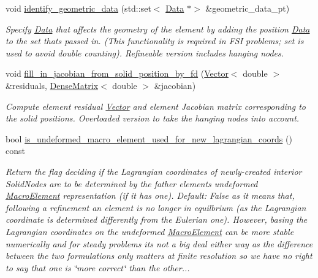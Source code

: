 \begin{DoxyCompactItemize}
void \hyperlink{classoomph_1_1RefineableSolidElement_a48623914f87556be55fb97cf68f0ee93}{identify\+\_\+geometric\+\_\+data} (std\+::set$<$ \hyperlink{classoomph_1_1Data}{Data} $\ast$$>$ \&geometric\+\_\+data\+\_\+pt)
\begin{DoxyCompactList}\small\item\em Specify \hyperlink{classoomph_1_1Data}{Data} that affects the geometry of the element by adding the position \hyperlink{classoomph_1_1Data}{Data} to the set that\textquotesingle{}s passed in. (This functionality is required in F\+SI problems; set is used to avoid double counting). Refineable version includes hanging nodes. \end{DoxyCompactList}\item 
void \hyperlink{classoomph_1_1RefineableSolidElement_a97f911c422af3e4fbd078b58cfe3e207}{fill\+\_\+in\+\_\+jacobian\+\_\+from\+\_\+solid\+\_\+position\+\_\+by\+\_\+fd} (\hyperlink{classoomph_1_1Vector}{Vector}$<$ double $>$ \&residuals, \hyperlink{classoomph_1_1DenseMatrix}{Dense\+Matrix}$<$ double $>$ \&jacobian)
\begin{DoxyCompactList}\small\item\em Compute element residual \hyperlink{classoomph_1_1Vector}{Vector} and element Jacobian matrix corresponding to the solid positions. Overloaded version to take the hanging nodes into account. \end{DoxyCompactList}\item 
bool \hyperlink{classoomph_1_1RefineableSolidElement_a23a8382cc9da7809752851db65e20241}{is\+\_\+undeformed\+\_\+macro\+\_\+element\+\_\+used\+\_\+for\+\_\+new\+\_\+lagrangian\+\_\+coords} () const
\begin{DoxyCompactList}\small\item\em Return the flag deciding if the Lagrangian coordinates of newly-\/created interior Solid\+Nodes are to be determined by the father element\textquotesingle{}s undeformed \hyperlink{classoomph_1_1MacroElement}{Macro\+Element} representation (if it has one). Default\+: False as it means that, following a refinement an element is no longer in equilbrium (as the Lagrangian coordinate is determined differently from the Eulerian one). However, basing the Lagrangian coordinates on the undeformed \hyperlink{classoomph_1_1MacroElement}{Macro\+Element} can be more stable numerically and for steady problems it\textquotesingle{}s not a big deal either way as the difference between the two formulations only matters at finite resolution so we have no right to say that one is \char`\"{}more correct\char`\"{} than the other... \end{DoxyCompactList}\item 
$$
\end{DoxyCompactItemize}
